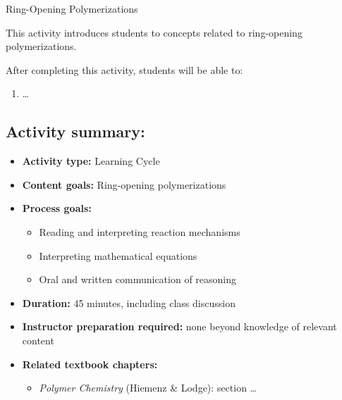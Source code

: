 %
%
%
%

\renewcommand{\figpath}{content/polymchem/livingpolyms/ringopening/figs}
\renewcommand{\labelbase}{ringopening}

\begin{activity}{Ring-Opening Polymerizations}

\begin{instructornotes}
	This activity introduces students to concepts related to ring-opening polymerizations.
	
	After completing this activity, students will be able to:
	\begin{enumerate}
		\item \dots
	\end{enumerate}
	
	\subsection*{Activity summary:}
	\begin{itemize}
		\item \textbf{Activity type:} Learning Cycle
		\item \textbf{Content goals:} Ring-opening polymerizations
		\item \textbf{Process goals:} %
			\begin{itemize}
				\item Reading and interpreting reaction mechanisms
				\item Interpreting mathematical equations
				\item Oral and written communication of reasoning
			\end{itemize}
		\item \textbf{Duration:} 45 minutes, including class discussion
		\item \textbf{Instructor preparation required:} none beyond knowledge of relevant content
		\item \textbf{Related textbook chapters:}
			\begin{itemize}
				\item \emph{Polymer Chemistry} (Hiemenz \& Lodge): section \dots
			\end{itemize}
	\end{itemize}
	

\end{instructornotes}
\end{activity}
